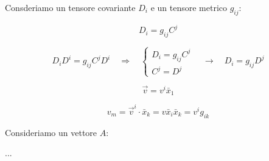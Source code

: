 \newpage

Consderiamo un tensore covariante $D_i$ e un tensore metrico $g_{ij}$:

$$
D_i = g_{ij} C^j
$$


$$
D_i D^i = g_{ij} C^j D^i \quad \Rightarrow \quad 
\begin{cases}
    D_i = g_{ij} C^j\\
    C^j = D^j
\end{cases}
\quad \rightarrow \quad 
D_i = g_{ij} D^j
$$

\vspace{5em}

$$
\vec v = v^i \bar x_1
$$

$$
v_m = \vec v^i \cdot \bar x_k = v \bar x_i \bar x_k = v^i g_{ik}
$$

Consideriamo un vettore $A$:

...

